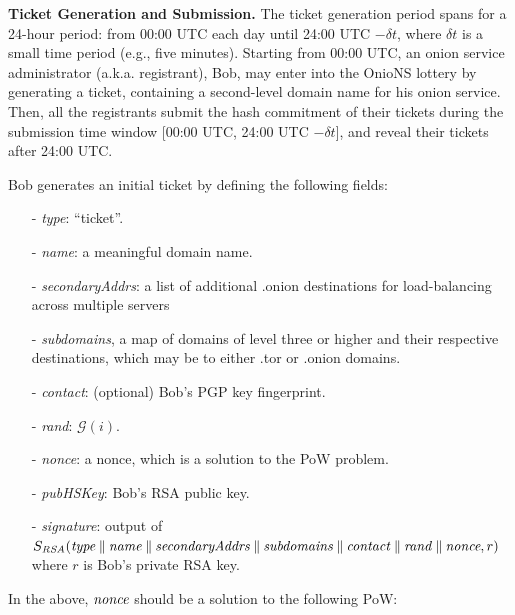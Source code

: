 \documentclass[USenglish,oneside,twocolumn]{article}
\newcommand*\concat{\mathbin{\|}}
\begin{document}
\textbf{Ticket Generation and Submission.}
The ticket generation period spans for a 24-hour period: from 00:00 UTC each day until 24:00 UTC $ - \delta t$, where $\delta t$ is a small time period (e.g., five minutes). Starting from 00:00 UTC, an onion service administrator (a.k.a. registrant), Bob, may enter into the OnioNS lottery by generating a ticket, containing a second-level domain name for his onion service. Then, all the registrants submit the hash commitment of their tickets during the submission time window [00:00 UTC, 24:00 UTC $ - \delta t $], and reveal their tickets after 24:00 UTC. 


Bob generates an initial ticket by defining the following fields:  
 \begin{enumerate}
 	\item[-] \emph{type}: ``ticket''.
 	\item[-]  \emph{name}: a meaningful domain name.
 	\item[-] \emph{secondaryAddrs}: a list of additional .onion destinations for load-balancing across multiple servers
 	\item[-] \emph{subdomains}, a map of domains of level three or higher and their respective destinations, which may be to either .tor or .onion domains.
 	\item[-] \emph{contact}: (optional) Bob's PGP key fingerprint.
 	\item[-] \emph{rand}: $ \mathcal{G}(i) $.
 	\item[-] \emph{nonce}: a nonce, which is a solution to the PoW problem.
 	 \item[-]  \emph{pubHSKey}: Bob's RSA public key.
 	\item[-]  \emph{signature}: output of  $ S_{\mathit{RSA}}(\mathit{type} \concat \mathit{name} \concat \mathit{secondaryAddrs} \concat \mathit{subdomains} \concat \mathit{contact} \concat \mathit{rand}\concat \emph{nonce}, r) $ where $ r $ is Bob's private RSA key.
 \end{enumerate} 
 
In the above, $\emph{nonce}$ should be a solution to the following PoW: 
 	
 	
\end{document}
